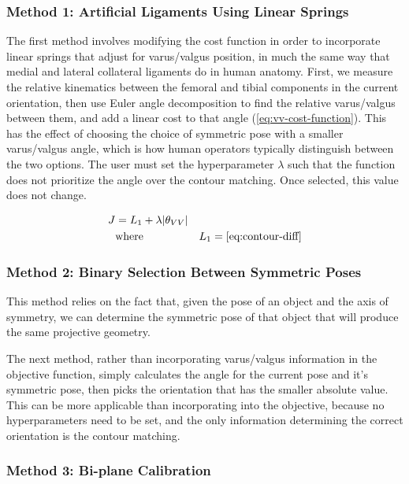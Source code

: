 \subsubsection{Method 1: Artificial Ligaments Using Linear Springs}
The first method involves modifying the cost function in order to incorporate linear springs that adjust for varus/valgus position, in much the same way that medial and lateral collateral ligaments do in human anatomy. First, we measure the relative kinematics between the femoral and tibial components in the current orientation, then use Euler angle decomposition to find the relative varus/valgus between them, and add a linear cost to that angle (\cref{eq:vv-cost-function}). This has the effect of choosing the choice of symmetric pose with a smaller varus/valgus angle, which is how human operators typically distinguish between the two options. The user must set the hyperparameter $\lambda$ such that the function does not prioritize the angle over the contour matching. Once selected, this value does not change.


\begin{equation}
    \begin{aligned}
        J &= L_1 + \lambda|\theta_{VV}| & \\
        & \text{where} & L_1 = \cref{eq:contour-diff}
    \end{aligned}
    \label{eq:vv-cost-function}
\end{equation}

\subsubsection{Method 2: Binary Selection Between Symmetric Poses}
This method relies on the fact that, given the pose of an object and the axis of symmetry, we can determine the symmetric pose of that object that will produce the same projective geometry.

The next method, rather than incorporating varus/valgus information in the objective function, simply calculates the angle for the current pose and it's symmetric pose, then picks the orientation that has the smaller absolute value. This can be more applicable than incorporating into the objective, because no hyperparameters need to be set, and the only information determining the correct orientation is the contour matching.

\subsubsection{Method 3: Bi-plane Calibration}

